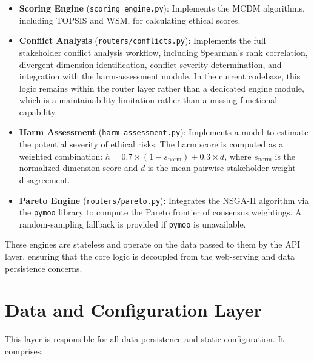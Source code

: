 \begin{itemize}[leftmargin=2em]
  \item \textbf{Scoring Engine} (\texttt{scoring\_engine.py}): Implements the MCDM algorithms, including TOPSIS and WSM, for calculating ethical scores.
  \item \textbf{Conflict Analysis} (\texttt{routers/conflicts.py}): Implements the full stakeholder conflict analysis workflow, including Spearman's rank correlation, divergent-dimension identification, conflict severity determination, and integration with the harm-assessment module. In the current codebase, this logic remains within the router layer rather than a dedicated engine module, which is a maintainability limitation rather than a missing functional capability.
  \item \textbf{Harm Assessment} (\texttt{harm\_assessment.py}): Implements a model to estimate the potential severity of ethical risks. The harm score is computed as a weighted combination: $h = 0.7 \times (1 - s_{\text{norm}}) + 0.3 \times \bar{d}$, where $s_{\text{norm}}$ is the normalized dimension score and $\bar{d}$ is the mean pairwise stakeholder weight disagreement.
  \item \textbf{Pareto Engine} (\texttt{routers/pareto.py}): Integrates the NSGA-II algorithm via the \texttt{pymoo} library to compute the Pareto frontier of consensus weightings. A random-sampling fallback is provided if \texttt{pymoo} is unavailable.
\end{itemize}

These engines are stateless and operate on the data passed to them by the API layer, ensuring that the core logic is decoupled from the web-serving and data persistence concerns.

\section{Data and Configuration Layer}
\label{sec:data}

This layer is responsible for all data persistence and static configuration. It comprises:

